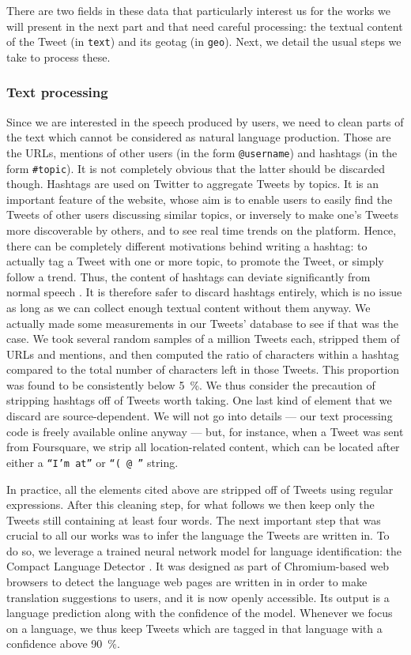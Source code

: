 \documentclass[../thesis.tex]{subfiles}
\begin{document}
There are two fields in these data that particularly interest us for the works we will
present in the next part and that need careful processing: the textual content of the
Tweet (in \texttt{text}) and its geotag (in \texttt{geo}). Next, we detail the usual
steps we take to process these. 


\subsubsection{Text processing}
\label{sec:method_text_process}
Since we are interested in the speech produced by users, we need to clean parts of the
text which cannot be considered as natural language production. Those are the URLs,
mentions of other users (in the form \texttt{@username}) and hashtags (in the form
\texttt{\#topic}). It is not completely obvious that the latter should be discarded
though. Hashtags are used on Twitter to aggregate Tweets by topics. It is an important
feature of the website, whose aim is to enable users to easily find the Tweets of other
users discussing similar topics, or inversely to make one's Tweets more discoverable by
others, and to see real time trends on the platform. Hence, there can be completely
different motivations behind writing a hashtag: to actually tag a Tweet with one or more
topic, to promote the Tweet, or simply follow a trend. Thus, the content of hashtags can
deviate significantly from normal speech \cite{PageLinguisticsSelfbranding2012}. It is
therefore safer to discard hashtags entirely, which is no issue as long as we can
collect enough textual content without them anyway. We actually made some measurements
in our Tweets' database to see if that was the case. We took several random samples of a
million Tweets each, stripped them of URLs and mentions, and then computed the ratio of
characters within a hashtag compared to the total number of characters left in those
Tweets. This proportion was found to be consistently below \SI{5}{\percent}. We thus
consider the precaution of stripping hashtags off of Tweets worth taking. One last kind
of element that we discard are source-dependent. We will not go into details --- our
text processing code is freely available online anyway --- but, for instance, when a
Tweet was sent from Foursquare, we strip all location-related content, which can be
located after either a \texttt{``I'm at''} or \texttt{``( @ ''} string.

In practice, all the elements cited above are stripped off of Tweets using regular
expressions. After this cleaning step, for what follows we then keep only the Tweets
still containing at least four words. The next important step that was crucial to all
our works was to infer the language the Tweets are written in. To do so, we leverage a
trained neural network model for language identification: the Compact Language Detector
\cite{SalcianuCompactLanguage2023}. It was designed as part of Chromium-based web
browsers to detect the language web pages are written in in order to make translation
suggestions to users, and it is now openly accessible. Its output is a language
prediction along with the confidence of the model. Whenever we focus on a language, we
thus keep Tweets which are tagged in that language with a confidence above
\SI{90}{\percent}.
\end{document}
